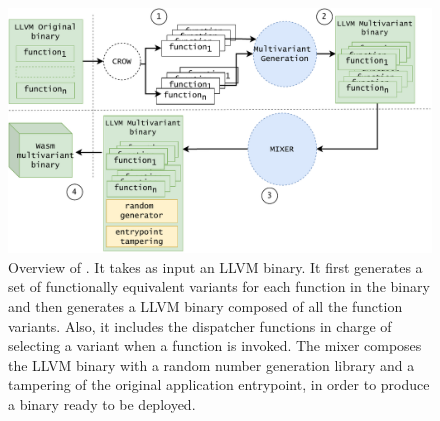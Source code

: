 
\begin{figure}
  \centering
  \includegraphics[width=\linewidth]{diagrams/MEWE.pdf}
  \caption{Overview of \tool. It takes as input an LLVM binary. It first generates a set of functionally equivalent variants for each function in the binary and then generates a LLVM binary composed of all the function variants. Also, it includes the dispatcher functions in charge of selecting a variant when a function is invoked. The \tool mixer composes the LLVM binary with a random number generation library and a tampering of the original application entrypoint, in order to produce a \wasm {}binary ready to be deployed. }
  \label{workflow}
\end{figure}

